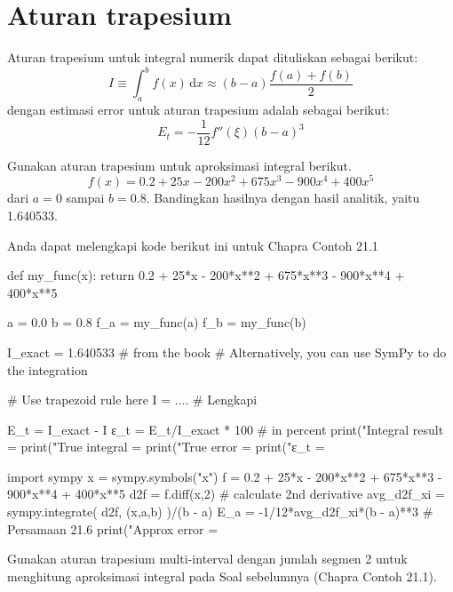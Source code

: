 \section{Aturan trapesium}

Aturan trapesium untuk integral numerik dapat dituliskan sebagai
berikut:
\begin{equation}
I \equiv \int_{a}^{b} f(x) \, \mathrm{d}x \approx (b - a) \frac{f(a) + f(b)}{2}
\end{equation}
dengan estimasi error untuk aturan trapesium adalah sebagai berikut:
\begin{equation}
E_{t} = -\frac{1}{12} f''(\xi) (b - a)^3
\end{equation}

\begin{soal}
Gunakan aturan trapesium untuk aproksimasi integral berikut.
\begin{equation*}
f(x) = 0.2 + 25x - 200x^2 + 675x^3 - 900x^4 + 400x^5
\end{equation*}
dari $a = 0$ sampai $b = 0.8$. Bandingkan hasilnya dengan hasil analitik,
yaitu 1.640533.
\end{soal}

Anda dapat melengkapi kode berikut ini untuk Chapra Contoh 21.1
\begin{pythoncode}
def my_func(x):
    return 0.2 + 25*x - 200*x**2 + 675*x**3 - 900*x**4 + 400*x**5

a = 0.0
b = 0.8
f_a = my_func(a)
f_b = my_func(b)

I_exact = 1.640533 # from the book
# Alternatively, you can use SymPy to do the integration

# Use trapezoid rule here
I = .... # Lengkapi

E_t = I_exact - I
ε_t = E_t/I_exact * 100 # in percent
print("Integral result = %
print("True integral   = %
print("True error      = %
print("ε_t             = %

import sympy
x = sympy.symbols("x")
f = 0.2 + 25*x - 200*x**2 + 675*x**3 - 900*x**4 + 400*x**5
d2f = f.diff(x,2) # calculate 2nd derivative
avg_d2f_xi = sympy.integrate( d2f, (x,a,b) )/(b - a)
E_a = -1/12*avg_d2f_xi*(b - a)**3 # Persamaan 21.6
print("Approx error    = %
\end{pythoncode}


\begin{soal}
Gunakan aturan trapesium multi-interval dengan jumlah segmen 2 untuk menghitung
aproksimasi integral pada Soal sebelumnya (Chapra Contoh 21.1).
\end{soal}